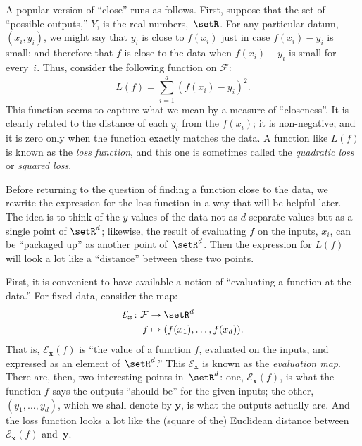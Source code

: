 \documentclass[10pt, a4paper]{article}
\begin{document}
A popular version of “close” runs as follows. First, suppose that the
set of “possible outputs,” $Y$, is the real numbers,~$\setR$. For any
particular datum, $(x_i, y_i)$, we might say that $y_i$ is close to
$f(x_i)$ just in case $ f(x_i)-y_i $ is small; and therefore that
$f$ is close to the data when $f(x_i)-y_i$ is small for
every~$i$. Thus, consider the following function on $\mathcal{F}$:
\[
L(f) = \sum_{i=1}^d{(f(x_i) - y_i)}^2.
\]
This function seems to capture what we mean by a measure of
“closeness”. It is clearly related to the distance of each $y_i$ from
the $f(x_i)$; it is non-negative; and it is zero only when the
function exactly matches the data. A function like $L(f)$ is known as
the \emph{loss function}, and this one is sometimes called the
\emph{quadratic loss} or \emph{squared loss}.

Before returning to the question of finding a function close to the
data, we rewrite the expression for the loss function in a way that
will be helpful later. The idea is to think of the $y$-values of the
data not as $d$ separate values but as a single point of $\setR^d$;
likewise, the result of evaluating $f$ on the inputs, $x_i$, can be
“packaged up” as another point of~$\setR^d$. Then the expression for
$L(f)$ will look a lot like a “distance” between these two points.

First, it is convenient to have available a notion of “evaluating a
function at the data.” For fixed data, consider the map:
\[
  \begin{aligned}
    \mathcal{E}_{\bm{x}} \colon \mathcal{F} &\to \setR^d \\
    f &\mapsto (f(x_1), \dotsc, f(x_d)).
  \end{aligned}
\]
That is, $\mathcal{E}_{\bm{x}}(f)$ is “the value of a function $f$, evaluated on
the inputs, and expressed as an element of~$\setR^d$.” This
$\mathcal{E}_{\bm{x}}$ is known as the \emph{evaluation map}. There are, then, two interesting points in~$\setR^d$: one,
$\mathcal{E}_{\bm{x}}(f)$, is what the function $f$ says the outputs “should be”
for the given inputs; the other, $(y_1, \dotsc, y_d)$, which we shall
denote by $\bm{y}$, is what the outputs actually are. And the loss
function looks a lot like the (square of the) Euclidean distance
between $\mathcal{E}_{\bm{x}}(f)$ and~$\bm{y}$. 
\end{document}
